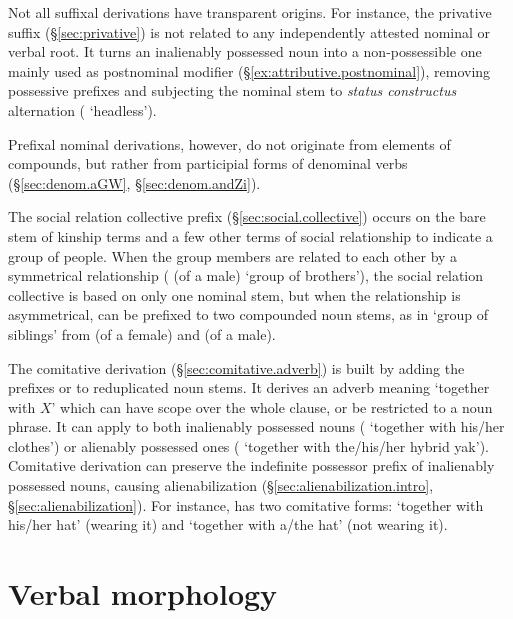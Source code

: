 Not all suffixal derivations have transparent origins. For instance, the privative  suffix (§\ref{sec:privative}) is not related to any independently attested nominal or verbal root. It turns an inalienably possessed noun into a non-possessible one mainly used as postnominal modifier (§\ref{ex:attributive.postnominal}), removing possessive prefixes and subjecting the nominal stem to \textit{status constructus} alternation ( \fl{}  `headless').

Prefixal nominal derivations, however, do not originate from elements of compounds, but rather from participial forms of denominal verbs (§\ref{sec:denom.aGW}, §\ref{sec:denom.andZi}). 

The social relation collective  prefix (§\ref{sec:social.collective}) occurs on the bare stem of kinship terms and a few other terms of social relationship to indicate a group of people. When the group members are  related to each other by a symmetrical relationship ( (of a male) \fl{}  `group of brothers'), the social relation collective is based on only one nominal stem, but when the relationship is asymmetrical,  can be prefixed to two compounded noun stems, as in  `group of siblings' from  (of a female) and  (of a male).
 
The comitative derivation (§\ref{sec:comitative.adverb}) is built by adding the prefixes  or  to reduplicated noun stems. It derives an adverb meaning `together with $X$' which can have scope over the whole clause, or be restricted to a noun phrase. It can apply to both inalienably possessed nouns ( \fl{}  `together with his/her clothes') or alienably possessed ones ( \fl{}  `together with the/his/her hybrid yak'). Comitative derivation can preserve the indefinite possessor prefix of inalienably possessed nouns, causing alienabilization (§\ref{sec:alienabilization.intro}, §\ref{sec:alienabilization}). For instance,  has two comitative forms:  `together with his/her hat' (wearing it)  and  `together with a/the hat' (not wearing it).

\section{Verbal morphology} \label{sec:verb.introduction}

